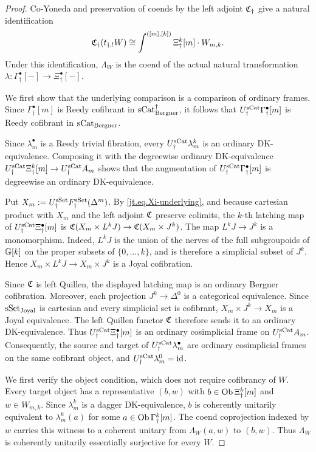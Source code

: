 \documentclass[a4paper,dvipdfmx,11pt]{amsart}
\begin{document}
\begin{proof}
  Co-Yoneda and preservation of coends by the left adjoint $\mathfrak{C}_{\dag}$ give a natural identification
  \begin{align}
    \mathfrak{C}_{\dag}(t_{\dag,!}W)
    \cong
    \int^{([m],[k])}
    \Xi^k_{\dag}[m]\cdot W_{m,k}.
  \end{align}
  Under this identification, $\Lambda_W$ is the coend of the actual natural transformation $\lambda:\Gamma^\bullet_{\dag}[-]\to\Xi^\bullet_{\dag}[-]$.

  We first show that the underlying comparison is a comparison of ordinary frames.
  Since $\Gamma^\bullet_{\dag}[m]$ is Reedy cofibrant in $\mathrm{sCat}^{\dag}_{\mathrm{Bergner}}$, it follows that $U_{\dag}^{\mathrm{sCat}}\Gamma^\bullet_{\dag}[m]$ is Reedy cofibrant in $\mathrm{sCat}_{\mathrm{Bergner}}$.
  
  Since $\lambda_m^\bullet$ is a Reedy trivial fibration, every $U_{\dag}^{\mathrm{sCat}}\lambda_m^k$ is an ordinary DK-equivalence.
  Composing it with the degreewise ordinary DK-equivalence $U_{\dag}^{\mathrm{sCat}}\Xi^k_{\dag}[m]\to U_{\dag}^{\mathrm{sCat}} A_m$ shows that the augmentation of $U_{\dag}^{\mathrm{sCat}}\Gamma^\bullet_{\dag}[m]$ is degreewise an ordinary DK-equivalence.

  Put $X_m:=U_{\dag}^{\mathrm{sSet}}F_{\dag}^{\mathrm{sSet}}(\Delta^m)$.
  By \eqref{jt.eq.Xi-underlying}, and because cartesian product with $X_m$ and the left adjoint $\mathfrak{C}$ preserve colimits, the $k$-th latching map of $U_{\dag}^{\mathrm{sCat}}\Xi^\bullet_{\dag}[m]$ is $\mathfrak{C}(X_m\times L^kJ)\to\mathfrak{C}(X_m\times J^k)$.
  The map $L^kJ\to J^k$ is a monomorphism.
  Indeed, $L^kJ$ is the union of the nerves of the full subgroupoids of $\mathbb{G}[k]$ on the proper subsets of $\{0,\ldots,k\}$, and is therefore a simplicial subset of $J^k$.
  Hence $X_m\times L^kJ\to X_m\times J^k$ is a Joyal cofibration.
  
  Since $\mathfrak{C}$ is left Quillen, the displayed latching map is an ordinary Bergner cofibration.
  Moreover, each projection $J^k\to\Delta^0$ is a categorical equivalence.
  Since $\mathrm{sSet}_{\mathrm{Joyal}}$ is cartesian and every simplicial set is cofibrant, $X_m\times J^k\to X_m$ is a Joyal equivalence.
  The left Quillen functor $\mathfrak{C}$ therefore sends it to an ordinary DK-equivalence.
  Thus $U_{\dag}^{\mathrm{sCat}}\Xi^\bullet_{\dag}[m]$ is an ordinary cosimplicial frame on $U_{\dag}^{\mathrm{sCat}} A_m$.
  Consequently, the source and target of $U_{\dag}^{\mathrm{sCat}}\lambda_m^\bullet$ are ordinary cosimplicial frames on the same cofibrant object, and $U_{\dag}^{\mathrm{sCat}}\lambda_m^0=\operatorname{id}$.

  We first verify the object condition, which does not require cofibrancy of $W$.
  Every target object has a representative $(b,w)$ with $b\in\operatorname{Ob}\Xi^k_{\dag}[m]$ and $w\in W_{m,k}$.
  Since $\lambda_m^k$ is a dagger DK-equivalence, $b$ is coherently unitarily equivalent to $\lambda_m^k(a)$ for some $a\in\operatorname{Ob}\Gamma^k_{\dag}[m]$.
  The coend coprojection indexed by $w$ carries this witness to a coherent unitary from $\Lambda_W(a,w)$ to $(b,w)$.
  Thus $\Lambda_W$ is coherently unitarily essentially surjective for every $W$.


\end{proof}
\end{document}
